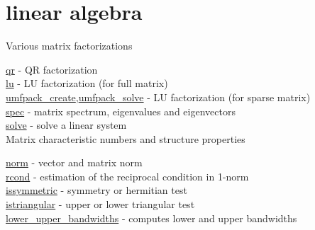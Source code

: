 \chapter*{linear algebra}

Various matrix factorizations

\hyperlink{qr}{qr} - QR factorization\\
\hyperlink{lu}{lu} - LU factorization (for full matrix) \\
\hyperlink{umfpack_create}{umfpack\_create},\hyperlink{umfpack_solve}{umfpack\_solve}
- LU factorization (for sparse matrix) \\
\hyperlink{spec}{spec} - matrix spectrum, eigenvalues and eigenvectors\\
\hyperlink{solve}{solve} - solve a linear system\\

Matrix characteristic numbers and structure properties

\hyperlink{norm}{norm} - vector and matrix norm\\
\hyperlink{rcond}{rcond} - estimation of the reciprocal condition in 1-norm\\
\hyperlink{issymmetric}{issymmetric} - symmetry or hermitian test\\
\hyperlink{istriangular}{istriangular} - upper or lower triangular test\\
\hyperlink{lower_upper_bandwidths}{lower\_upper\_bandwidths} - computes lower and upper bandwidths\\


 
 
 
 
 
 
 
 


